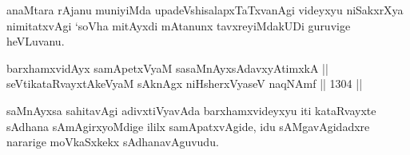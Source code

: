 \begin{artha}
anaMtara rAjanu muniyiMda upadeVshisalapxTaTxvanAgi videyxyu niSakxrXya nimitatxvAgi `soV\s ha mitAyxdi mAtanunx tavxreyiMdakUDi guruvige heVLuvanu.
\end{artha}


\begin{shl}
barxhamxvidAyx samApetxVyaM sasaMnAyxsA\s davxyAtimxkA || \\
seVtikataRvayxtAkeVyaM sAknAgx niHsherxVyaseV naqNAmf \hfill || 1304 ||  
\end{shl}

\begin{artha}
saMnAyxsa sahitavAgi adivxtiVyavAda barxhamxvideyxyu iti kataRvayxte sAdhana sAmAgirxyoMdige ililx samApatxvAgide, idu sAMgavAgidadxre nararige moVkaSxkekx sAdhanavAguvudu.
\end{artha}
